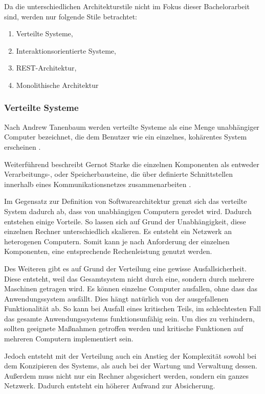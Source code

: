 Da die unterschiedlichen Architekturstile nicht im  Fokus dieser Bachelorarbeit sind, werden nur folgende Stile betrachtet:

\begin{enumerate}
	\item Verteilte Systeme,
	\item Interaktionsorientierte Systeme,
	\item REST-Architektur,
	\item Monolithische Architektur
\end{enumerate}


\subsubsection{Verteilte Systeme}
\label{sec:verteilte-systeme}

Nach Andrew Tanenbaum werden verteilte Systeme als eine Menge unabhängiger Computer bezeichnet, die dem Benutzer wie ein einzelnes, kohärentes System erscheinen \parencite{tanenbaum_verteilte_2007}.

Weiterführend beschreibt Gernot Starke die einzelnen Komponenten als entweder Verarbeitungs-, oder Speicherbausteine, die über definierte Schnittstellen innerhalb eines Kommunikationsnetzes zusammenarbeiten \parencite[vgl.][S. 116]{starke_effektive_2015}.

Im Gegensatz zur Definition von Softwarearchitektur grenzt sich das verteilte System dadurch ab, dass von unabhängigen Computern geredet wird. Dadurch entstehen einige Vorteile. So lassen sich auf Grund der Unabhängigkeit, diese einzelnen Rechner unterschiedlich skalieren. Es entsteht ein Netzwerk an heterogenen Computern. Somit kann je nach Anforderung der einzelnen Komponenten, eine entsprechende Rechenleistung genutzt werden.

Des Weiteren gibt es auf Grund der Verteilung eine gewisse Ausfallsicherheit. Diese entsteht, weil das Gesamtsystem nicht durch eine, sondern durch mehrere Maschinen getragen wird. Es können einzelne Computer ausfallen, ohne dass das Anwendungssystem ausfällt. Dies hängt natürlich von der ausgefallenen Funktionalität ab. So kann bei Ausfall eines kritischen Teils,  im schlechtesten Fall das gesamte Anwendungssystems funktionsunfähig sein. Um dies zu verhindern, sollten geeignete Maßnahmen getroffen werden und kritische Funktionen auf mehreren Computern implementiert sein.

Jedoch entsteht mit der Verteilung auch ein Anstieg der Komplexität sowohl bei dem Konzipieren des Systems, als auch bei der Wartung und Verwaltung dessen. Außerdem muss nicht nur ein Rechner abgesichert werden, sondern ein ganzes Netzwerk. Dadurch entsteht ein höherer Aufwand zur Absicherung.

